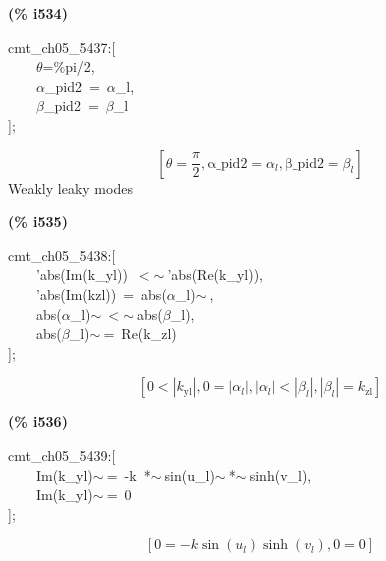 \documentclass[fleqn]{article}
\begin{document}
\noindent
\begin{minipage}[t]{4.000000em}\color{red}\bfseries
(\% i534)	
\end{minipage}
\begin{minipage}[t]{\textwidth}\color{blue}
cmt\_ch05\_5437:[\\
\ \ \ \ \ensuremath{\theta}=\%pi/2,\\
\ \ \ \ \ensuremath{\alpha}\_pid2\ =\ \ensuremath{\alpha}\_l,\\
\ \ \ \ \ensuremath{\beta}\_pid2\ =\ \ensuremath{\beta}\_l\\
];
\end{minipage}
\[\displaystyle \tag{\% o534} 
\left[ \theta =\frac{\ensuremath{\pi} }{2}\operatorname{,}\ensuremath{\mathrm{\alpha \_ pid2}}={{\alpha }_l}\operatorname{,}\ensuremath{\mathrm{\beta \_ pid2}}={{\beta }_l}\right] \mbox{}
\]
Weakly leaky modes


\noindent
\begin{minipage}[t]{4.000000em}\color{red}\bfseries
(\% i535)	
\end{minipage}
\begin{minipage}[t]{\textwidth}\color{blue}
cmt\_ch05\_5438:[\\
\ \ \ \ 'abs(Im(k\_yl))\ \ensuremath{<}\ensuremath{\sim\ }'abs(Re(k\_yl)),\\
\ \ \ \ 'abs(Im(kzl))\ =\ abs(\ensuremath{\alpha}\_l)\ensuremath{\sim\ },\ \\
\ \ \ \ abs(\ensuremath{\alpha}\_l)\ensuremath{\sim\ }\ensuremath{<}\ensuremath{\sim\ }abs(\ensuremath{\beta}\_l),\ \\
\ \ \ \ abs(\ensuremath{\beta}\_l)\ensuremath{\sim\ }=\ Re(k\_zl)\\
];
\end{minipage}
\[\displaystyle \tag{\% o535} 
\left[ 0\operatorname{<  }\left| {k_{\ensuremath{\mathrm{yl}}}}\right| \operatorname{,}0=\left| {{\alpha }_l}\right| \operatorname{,}\left| {{\alpha }_l}\right| \operatorname{<  }\left| {{\beta }_l}\right| \operatorname{,}\left| {{\beta }_l}\right| ={k_{\ensuremath{\mathrm{zl}}}}\right] \mbox{}
\]


\noindent
\begin{minipage}[t]{4.000000em}\color{red}\bfseries
(\% i536)	
\end{minipage}
\begin{minipage}[t]{\textwidth}\color{blue}
cmt\_ch05\_5439:[\\
\ \ \ \ Im(k\_yl)\ensuremath{\sim\ }=\ -k\ *\ensuremath{\sim\ }sin(u\_l)\ensuremath{\sim\ }*\ensuremath{\sim\ }sinh(v\_l),\\
\ \ \ \ Im(k\_yl)\ensuremath{\sim\ }=\ 0\\
];
\end{minipage}
\[\displaystyle \tag{\% o536} 
\left[ 0=-k \sin{\left( {u_l}\right) } \sinh{\left( {v_l}\right) }\operatorname{,}0=0\right] \mbox{}
\]
\end{document}

